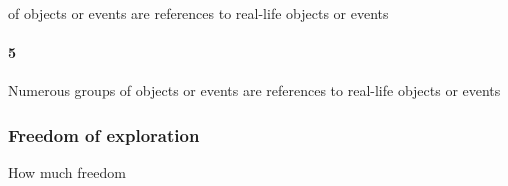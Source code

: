  of objects or events are references to real-life objects or events\paragraph{5}Numerous groups of objects or events are references to real-life objects or events\subsubsection{Freedom of exploration}How much freedom